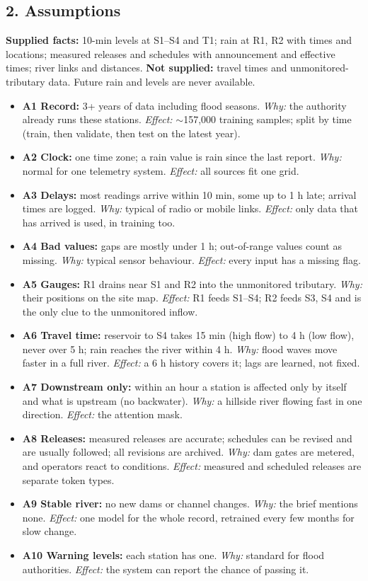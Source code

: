\documentclass[10pt,a4paper]{article}
\begin{document}
\subsection{2. Assumptions}
\textbf{Supplied facts:} 10-min levels at S1--S4 and T1; rain at R1, R2 with times and locations; measured releases and schedules with announcement and effective times; river links and distances. \textbf{Not supplied:} travel times and unmonitored-tributary data. Future rain and levels are never available.
\begin{itemize}
\item \textbf{A1 Record:} 3+ years of data including flood seasons. \emph{Why:} the authority already runs these stations. \emph{Effect:} $\sim$157,000 training samples; split by time (train, then validate, then test on the latest year).
\item \textbf{A2 Clock:} one time zone; a rain value is rain since the last report. \emph{Why:} normal for one telemetry system. \emph{Effect:} all sources fit one grid.
\item \textbf{A3 Delays:} most readings arrive within 10 min, some up to 1 h late; arrival times are logged. \emph{Why:} typical of radio or mobile links. \emph{Effect:} only data that has arrived is used, in training too.
\item \textbf{A4 Bad values:} gaps are mostly under 1 h; out-of-range values count as missing. \emph{Why:} typical sensor behaviour. \emph{Effect:} every input has a missing flag.
\item \textbf{A5 Gauges:} R1 drains near S1 and R2 into the unmonitored tributary. \emph{Why:} their positions on the site map. \emph{Effect:} R1 feeds S1--S4; R2 feeds S3, S4 and is the only clue to the unmonitored inflow.
\item \textbf{A6 Travel time:} reservoir to S4 takes 15 min (high flow) to 4 h (low flow), never over 5 h; rain reaches the river within 4 h. \emph{Why:} flood waves move faster in a full river. \emph{Effect:} a 6 h history covers it; lags are learned, not fixed.
\item \textbf{A7 Downstream only:} within an hour a station is affected only by itself and what is upstream (no backwater). \emph{Why:} a hillside river flowing fast in one direction. \emph{Effect:} the attention mask.
\item \textbf{A8 Releases:} measured releases are accurate; schedules can be revised and are usually followed; all revisions are archived. \emph{Why:} dam gates are metered, and operators react to conditions. \emph{Effect:} measured and scheduled releases are separate token types.
\item \textbf{A9 Stable river:} no new dams or channel changes. \emph{Why:} the brief mentions none. \emph{Effect:} one model for the whole record, retrained every few months for slow change.
\item \textbf{A10 Warning levels:} each station has one. \emph{Why:} standard for flood authorities. \emph{Effect:} the system can report the chance of passing it.
\end{itemize}
\end{document}
